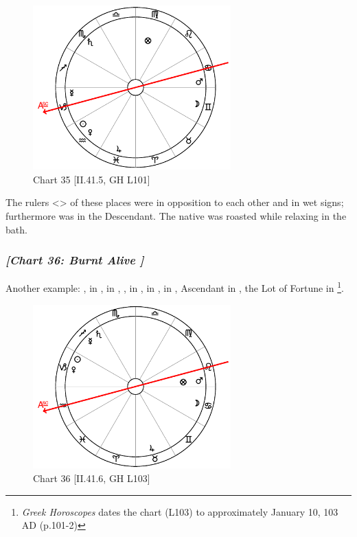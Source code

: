 \clearpage
\begin{figure}
\centering
\vspace{-20pt}
\includegraphics[width=0.68\textwidth]{charts/2_41_5}
\caption{Chart 35 [II.41.5, GH L101]}
\label{fig:chart35}
\end{figure}

The rulers <\Mars\xspace \Mercury> of these places were in opposition to each other and in wet signs; furthermore \Mars\xspace was in the Descendant. The native was roasted while relaxing in the bath. 
\newpage
\subsubsection{\textit{[Chart 36: Burnt Alive ]}}
Another example: \Sun, \Venus\xspace in \Capricorn, \Moon\xspace in \Cancer, \Saturn, \Mercury\xspace in \Sagittarius, \Jupiter\xspace in \Taurus, \Mars\xspace in \Leo, Ascendant in \Aquarius, the Lot of Fortune in \Leo
\footnote{\textit{Greek Horoscopes} dates the chart (L103) to approximately January 10, 103 AD (p.101-2)}.

\clearpage
\begin{figure}
\centering
\vspace{-20pt}
\includegraphics[width=0.68\textwidth]{charts/2_41_6}
\caption{Chart 36 [II.41.6, GH L103]}
\label{fig:chart36}
\end{figure}

